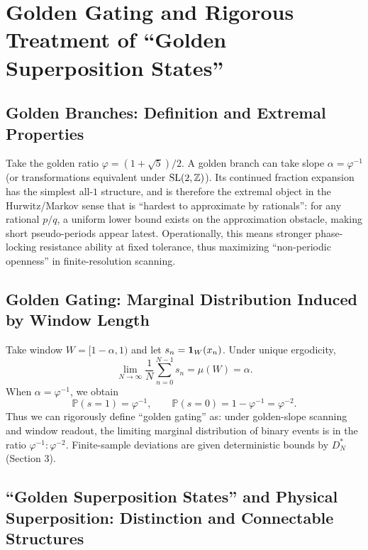 \section{Golden Gating and Rigorous Treatment of ``Golden Superposition States''}

\subsection{Golden Branches: Definition and Extremal Properties}

Take the golden ratio $\varphi=(1+\sqrt5)/2$. A golden branch can take slope $\alpha=\varphi^{-1}$ (or transformations equivalent under $\mathrm{SL}(2,\mathbb{Z})$). Its continued fraction expansion has the simplest all-$1$ structure, and is therefore the extremal object in the Hurwitz/Markov sense that is ``hardest to approximate by rationals'': for any rational $p/q$, a uniform lower bound exists on the approximation obstacle, making short pseudo-periods appear latest. Operationally, this means stronger phase-locking resistance ability at fixed tolerance, thus maximizing ``non-periodic openness'' in finite-resolution scanning.

\subsection{Golden Gating: Marginal Distribution Induced by Window Length}

Take window $W=[1-\alpha,1)$ and let $s_n=\mathbf{1}_W(x_n)$. Under unique ergodicity,
\[
\lim_{N\to\infty}\frac1N\sum_{n=0}^{N-1}s_n=\mu(W)=\alpha.
\]
When $\alpha=\varphi^{-1}$, we obtain
\[
\mathbb{P}(s=1)=\varphi^{-1},\qquad \mathbb{P}(s=0)=1-\varphi^{-1}=\varphi^{-2}.
\]
Thus we can rigorously define ``golden gating'' as: under golden-slope scanning and window readout, the limiting marginal distribution of binary events is in the ratio $\varphi^{-1}:\varphi^{-2}$. Finite-sample deviations are given deterministic bounds by $D_N^*$ (Section 3).

\subsection{``Golden Superposition States'' and Physical Superposition: Distinction and Connectable Structures}

